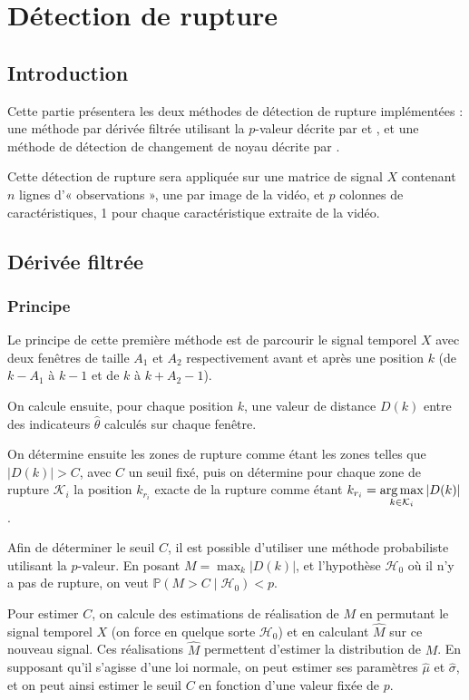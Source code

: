 \chapter{Détection de rupture}

\section{Introduction}

Cette partie présentera les deux méthodes de détection de rupture implémentées : une méthode par dérivée filtrée utilisant la $p$-valeur décrite par \cite{Bertrand11} et \cite{Herault14}, et une méthode de détection de changement de noyau décrite par \cite{Desobry05}.

Cette détection de rupture sera appliquée sur une matrice de signal $X$ contenant $n$ lignes d'« observations », une par image de la vidéo, et $p$ colonnes de caractéristiques, 1 pour chaque caractéristique extraite de la vidéo.

\section{Dérivée filtrée}

\subsection{Principe}

Le principe de cette première méthode est de parcourir le signal temporel $X$ avec deux fenêtres de taille $A_1$ et $A_2$ respectivement avant et après une position $k$ (de $k - A_1$ à $k-1$ et de $k$ à $k+A_2-1$).

On calcule ensuite, pour chaque position $k$, une valeur de distance $D(k)$ entre des indicateurs $\hat{\theta}$ calculés sur chaque fenêtre.

On détermine ensuite les zones de rupture comme étant les zones telles que $|D(k)| > C$, avec $C$ un seuil fixé, puis on détermine pour chaque zone de rupture $\mathcal{K}_i$ la position $k_{r_i}$ exacte de la rupture comme étant $k_{r_i} = \displaystyle \operatorname*{arg\,max}_{k \in \mathcal{K}_i} |D(k)|$.

Afin de déterminer le seuil $C$, il est possible d'utiliser une méthode probabiliste utilisant la $p$-valeur. En posant $M = \displaystyle \max_{k} |D(k)|$, et l'hypothèse $\mathcal{H}_0$ où il n'y a pas de rupture, on veut $\mathbb{P}(M>C\mid	\mathcal{H}_0) < p$.

Pour estimer $C$, on calcule des estimations de réalisation de $M$ en permutant le signal temporel $X$ (on force en quelque sorte $\mathcal{H}_0$) et en calculant $\hat{M}$ sur ce nouveau signal. Ces réalisations $\hat{M}$ permettent d'estimer la distribution de $M$. En supposant qu'il s'agisse d'une loi normale, on peut estimer ses paramètres $\hat{\mu}$ et $\hat{\sigma}$, et on peut ainsi estimer le seuil $C$ en fonction d'une valeur fixée de $p$.

